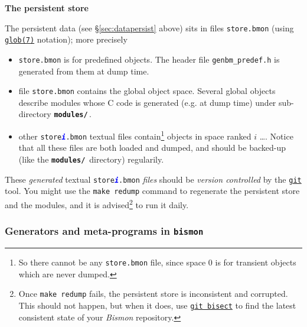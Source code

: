 {\large \textbf{The persistent store}}

The persistent data (see \S \ref{sec:datapersist} above) sits in files
 
 \texttt{store\textsection*.bmon}
(using
\href{https://man7.org/linux/man-pages/man7/glob.7.html}{\texttt{glob(7)}}
notation); more precisely

\begin{itemize}

\item \texttt{store.bmon} is for predefined objects. The header file
  \texttt{genbm\_predef.h} is generated from them at dump time.

\item file \texttt{store.bmon} contains the global object space. Several
  global objects describe modules whose C code is generated (e.g. at
  dump time)   under sub-directory
  \textbf{\texttt{modules/}}\,.

\item other \texttt{store\textsection\textcolor{blue}{\textbf{\textit{i}}}.bmon}
  textual files contain\footnote{So there cannot be any
    \texttt{store.bmon} file, since space 0 is for transient objects
    which are never dumped.}  objects in space ranked $i$ \ldots. Notice
  that all these files are both loaded and dumped, and should be
  backed-up (like the \textbf{\texttt{modules/}}\, directory)
  regularily.

\end{itemize}

These \emph{generated} textual
\texttt{store\textsection\textcolor{blue}{\textit{\textbf{i}}}.bmon} \emph{files}
should be \emph{version controlled} by the
\href{https://git-scm.com/}{\texttt{git}} tool. You might use the \texttt{make
  redump} command to regenerate the persistent store and the modules,
and it is advised\footnote{Once \texttt{make redump} fails, the
  persistent store is inconsistent and corrupted. This should not
  happen, but when it does, use
  \href{https://git-scm.com/docs/git-bisect}{\texttt{git bisect}} to
  find the latest consistent state of your \textit{Bismon} repository.}
to run it daily.
  
\subsubsection{Generators and meta-programs in \texttt{bismon}}

